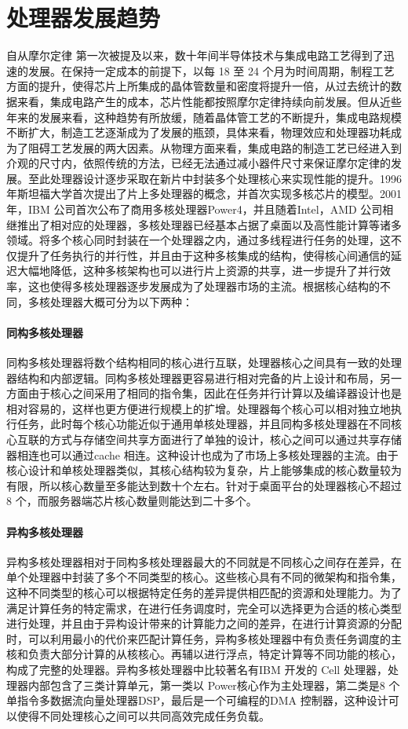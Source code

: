 \section{处理器发展趋势}
自从摩尔定律\cite{schaller1997moore,moore1998cramming} 第一次被提及以来，数十年间半导体技术与集成电路工艺得到了迅速的发展。在保持一定成本的前提下，以每 18 至 24 个月为时间周期，制程工艺方面的提升，使得芯片上所集成的晶体管数量和密度将提升一倍，从过去统计的数据来看，集成电路产生的成本，芯片性能都按照摩尔定律持续向前发展。但从近些年来的发展来看，这种趋势有所放缓，随着晶体管工艺的不断提升，集成电路规模不断扩大，制造工艺逐渐成为了发展的瓶颈，具体来看，物理效应和处理器功耗成为了阻碍工艺发展的两大因素。从物理方面来看，集成电路的制造工艺已经进入到介观的尺寸内，依照传统的方法，已经无法通过减小器件尺寸来保证摩尔定律的发展。至此处理器设计逐步采取在新片中封装多个处理核心来实现性能的提升。1996 年斯坦福大学首次提出了片上多处理器的概念，并首次实现多核芯片的模型。2001 年，IBM 公司首次公布了商用多核处理器Power4\cite{tendler2002power4}，并且随着Intel，AMD 公司相继推出了相对应的处理器，多核处理器已经基本占据了桌面以及高性能计算等诸多领域。将多个核心同时封装在一个处理器之内，通过多线程进行任务的处理，这不仅提升了任务执行的并行性，并且由于这种多核集成的结构，使得核心间通信的延迟大幅地降低，这种多核架构也可以进行片上资源的共享，进一步提升了并行效率，这也使得多核处理器逐步发展成为了处理器市场的主流。根据核心结构的不同，多核处理器大概可分为以下两种：

\paragraph{同构多核处理器}
同构多核处理器将数个结构相同的核心进行互联，处理器核心之间具有一致的处理器结构和内部逻辑。同构多核处理器更容易进行相对完备的片上设计和布局，另一方面由于核心之间采用了相同的指令集，因此在任务并行计算以及编译器设计也是相对容易的，这样也更方便进行规模上的扩增。处理器每个核心可以相对独立地执行任务，此时每个核心功能近似于通用单核处理器，并且同构多核处理器在不同核心互联的方式与存储空间共享方面进行了单独的设计，核心之间可以通过共享存储器相连也可以通过cache 相连。这种设计也成为了市场上多核处理器的主流。由于核心设计和单核处理器类似，其核心结构较为复杂，片上能够集成的核心数量较为有限，所以核心数量至多能达到数十个左右。针对于桌面平台的处理器核心不超过 8 个，而服务器端芯片核心数量则能达到二十多个\cite{arafa2019cascade}。
\paragraph{异构多核处理器}
异构多核处理器相对于同构多核处理器最大的不同就是不同核心之间存在差异，在单个处理器中封装了多个不同类型的核心。这些核心具有不同的微架构和指令集，这种不同类型的核心可以根据特定任务的差异提供相匹配的资源和处理能力。为了满足计算任务的特定需求，在进行任务调度时，完全可以选择更为合适的核心类型进行处理，并且由于异构设计带来的计算能力之间的差异，在进行计算资源的分配时，可以利用最小的代价来匹配计算任务，异构多核处理器中有负责任务调度的主核和负责大部分计算的从核核心。再辅以进行浮点，特定计算等不同功能的核心，构成了完整的处理器。异构多核处理器中比较著名有IBM 开发的 Cell 处理器\cite{pham2005design}，处理器内部包含了三类计算单元，第一类以 Power核心作为主处理器，第二类是8 个单指令多数据流向量处理器DSP，最后是一个可编程的DMA 控制器，这种设计可以使得不同处理核心之间可以共同高效完成任务负载。

